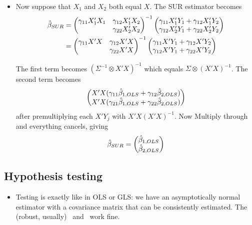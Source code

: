 \begin{itemize}[leftmargin=0pt]
\item Now suppose that $X_1$ and $X_2$ both equal $X$.
  The SUR estimator becomes
  \begin{align*}
    \hat{\beta}_{SUR}
    &= \begin{pmatrix}
      \gamma_{11} X_1'X_1 & \gamma_{12} X_1'X_2 \\ & \gamma_{22} X_2'X_2 
    \end{pmatrix}^{-1}
    \begin{pmatrix}
      \gamma_{11} X_1'Y_1 + \gamma_{12} X_1'Y_2 \\
      \gamma_{12} X_2'Y_1 + \gamma_{22} X_2'Y_2
    \end{pmatrix} \\
    &= \begin{pmatrix}
      \gamma_{11} X'X & \gamma_{12} X'X \\ & \gamma_{22}X'X
    \end{pmatrix}^{-1}
    \begin{pmatrix}
      \gamma_{11} X'Y_1 + \gamma_{12}X'Y_2 \\
      \gamma_{12} X'Y_1 + \gamma_{22} X'Y_2
    \end{pmatrix}
  \end{align*}

  The first term becomes $(\Sigma^{-1} \otimes X'X)^{-1}$ which equals
  $\Sigma \otimes (X'X)^{-1}$. The second term becomes
  \[\begin{pmatrix}
    X'X (\gamma_{11}\hat{\beta}_{1,OLS} + \gamma_{12}\hat{\beta}_{2,OLS}) \\
    X'X (\gamma_{21}\hat{\beta}_{1,OLS} + \gamma_{22}\hat{\beta}_{2,OLS})
  \end{pmatrix}\] after premultiplying each $X'Y_j$ with
  $X'X(X'X)^{-1}$. Now Multiply through and everything cancels, giving
  \begin{equation*}
    \hat{\beta}_{SUR} =
    \begin{pmatrix} \hat{\beta}_{1,OLS} \\ \hat{\beta}_{2,OLS} \end{pmatrix}
  \end{equation*}
\end{itemize}

\subsection{Hypothesis testing}

\begin{itemize}[leftmargin=0pt]
\item Testing is exactly like in OLS or GLS: we have an asymptotically
  normal estimator with a covariance matrix that can be consistently
  estimated.  The (robust, usually) \ttest\ and \ftest\ work fine.
\end{itemize}

